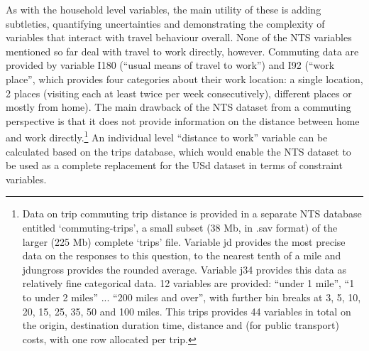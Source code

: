 As with the household level variables, the main utility of these is adding
subtleties, quantifying uncertainties and demonstrating the complexity of
variables that interact with travel behaviour overall. None of the NTS variables
mentioned so far deal with travel to work directly, however. Commuting data are
provided by variable I180 (``usual means of travel to work'') and I92 (``work
place'', which provides four categories about their work location: a single
location, 2 places (visiting each at least twice per week consecutively),
different places or mostly from home). The main drawback of the NTS dataset
from a commuting perspective is that it does not provide information on the
distance between home and
work directly.\footnote{Data
on trip commuting trip distance is
provided in a separate NTS database entitled `commuting-trips', a small subset
(38 Mb, in .sav format) of the larger (225 Mb) complete `trips' file. Variable
jd provides the most precise data on the responses to this question, to the
nearest tenth of a mile and jdungross provides the rounded average.
Variable j34 provides this data as relatively fine categorical data. 12
variables are provided: ``under 1 mile'', ``1 to under 2 miles'' ... ``200 miles
and over'', with further bin breaks at 3, 5, 10, 20, 15, 25, 35, 50 and 100
miles. This trips provides 44 variables in total on the origin, destination
duration time, distance and (for public transport) costs, with one row allocated
per trip. } %
An individual level ``distance to work'' variable can be calculated based on
the
trips database, which would enable the NTS dataset to be used as a complete
replacement for the USd dataset in terms of constraint variables.


